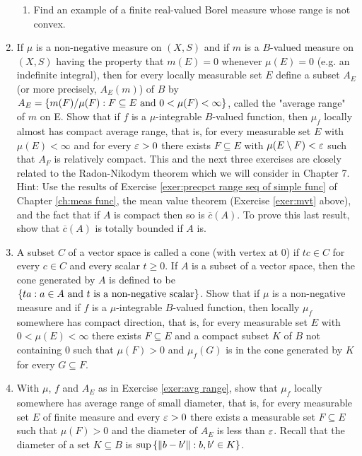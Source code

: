 \begin{enumerate}[label=\arabic*),ref=\arabic*]
\begin{enumerate}[label=\alph*),ref=\theenumi\alph*)]
    \item Find an example of a finite real-valued Borel measure whose range is not convex.
\end{enumerate}

\item \label{exer:avg range}
If $\mu$ is a non-negative measure on $(X, S)$ and if $m$ is a $B$-valued measure on $(X,S)$ having the property that $m(E)=0$ whenever $\mu(E)=0$ (e.g. an indefinite integral), then for every locally measurable set $E$ define a subset $A_E$ (or more precisely, $A_E(m)$) of $B$ by $A_E=\left\{m(F)/\mu(F):F\subseteq E\text{ and }0<\mu(F)<\infty\right\}$, called the "average range" of $m$ on E. Show that if $f$ is a $\mu$-integrable $B$-valued function, then $\mu_f$ locally almost has compact average range, that is, for every measurable set $E$ with $\mu(E)<\infty$ and for every $\varepsilon>0$ there exists $F\subseteq E$ with $\mu(E\setminus F)<\varepsilon$ such that $A_F$ is relatively compact. This and the next three exercises are closely related to the Radon-Nikodym theorem which we will consider in Chapter 7. %
Hint: Use the results of Exercise \ref{exer:precpct range seq of simple func} of Chapter \ref{ch:meas func}, the mean value theorem (Exercise \ref{exer:mvt} above), and the fact that if $A$ is compact then so is $\overline{c}(A)$. To prove this last result, show that $\overline{c}(A)$ is totally bounded if $A$ is.

\item \label{exer:cone}
A subset $C$ of a vector space is called a cone (with vertex at 0) if $tc\in C$ for every $c\in C$ and every scalar $t\geq0$. If $A$ is a subset of a vector space, then the cone generated by $A$ is defined to be $\left\{ta:a\in A\text{ and }t\text{ is a non-negative scalar}\right\}$. Show that if $\mu$ is a non-negative measure and if $f$ is a $\mu$-integrable $B$-valued function, then locally $\mu_f$ somewhere has compact direction, that is, for every measurable set $E$ with $0<\mu(E)<\infty$ there exists $F\subseteq E$ and a compact subset $K$ of $B$ not containing $0$ such that $\mu(F)>0$ and $\mu_f(G)$ is in the cone generated by $K$ for every $G\subseteq F$.

\item \label{exer:indef int locally avg range of small diam}
With $\mu$, $f$ and $A_E$ as in Exercise \ref{exer:avg range}, show that $\mu_f$ locally somewhere has average range of small diameter, that is, for every measurable set $E$ of finite measure and every $\varepsilon>0$ there exists a measurable set $F\subseteq E$ such that $\mu(F)>0$ and the diameter of $A_E$ is less than $\varepsilon$. Recall that the diameter of a set $K\subseteq B$ is $\sup\left\{\norm{b-b'}:b,b'\in K\right\}$.


\end{enumerate}

